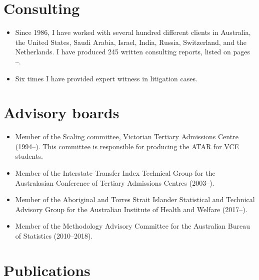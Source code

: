 \documentclass[10pt,a4paper,]{article}
\providecommand{\tightlist}{%
  \setlength{\itemsep}{0pt}\setlength{\parskip}{0pt}}
\newcounter{papers}
\begin{document}
\hypertarget{consulting}{%
\section{Consulting}\label{consulting}}

\begin{itemize}
\tightlist
\item
  Since 1986, I have worked with several hundred different clients in
  Australia, the United States, Saudi Arabia, Israel, India, Russia,
  Switzerland, and the Netherlands. I have produced 245 written
  consulting reports, listed on pages
  \pageref{consultingstart}--\pageref{consultingend}.
\item
  Six times I have provided expert witness in litigation cases.
\end{itemize}

\hypertarget{advisory-boards}{%
\section{Advisory boards}\label{advisory-boards}}

\begin{itemize}
\tightlist
\item
  Member of the Scaling committee, Victorian Tertiary Admissions Centre
  (1994--). This committee is responsible for producing the ATAR for VCE
  students.
\item
  Member of the Interstate Transfer Index Technical Group for the
  Australasian Conference of Tertiary Admissions Centres (2003--).
\item
  Member of the Aboriginal and Torres Strait Islander Statistical and
  Technical Advisory Group for the Australian Institute of Health and
  Welfare (2017--).
\item
  Member of the Methodology Advisory Committee for the Australian Bureau
  of Statistics (2010--2018).
\end{itemize}

\newpage

\hypertarget{publications}{%
\section{Publications}\label{publications}}

\label{papersstart}
\newrefcontext[sorting=ynt]\setcounter{papers}{0}\pagebreak[3]\printbibliography[category=bib1,heading=bib1]\setcounter{papers}{0}
\end{document}
